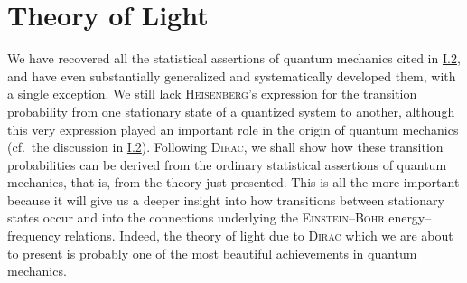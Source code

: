 \documentclass[fontsize=13pt,twoside,openany,headings=normal,parskip=false,bookmarkpackage=false,DIV=calc]{scrbook}
\begin{document}
\hypertarget{origpage-135}{}%
\section{Theory of Light}\label{sec:III.6}
We have recovered all the statistical assertions of quantum mechanics cited in \hyperref[sec:I.2]{I.2}, and have even substantially generalized and systematically developed them, with a single exception. We still lack \textsc{Heisenberg}'s expression for the transition probability from one stationary state of a quantized system to another, although this very expression played an important role in the origin of quantum mechanics (cf.\ the discussion in \hyperref[sec:I.2]{I.2}). Following \textsc{Dirac}, we shall show how these transition probabilities can be derived from the ordinary statistical assertions of quantum mechanics, that is, from the theory just presented. This is all the more important because it will give us a deeper insight into how transitions between stationary states occur and into the connections underlying the \textsc{Einstein--Bohr} energy--frequency relations. Indeed, the theory of light due to \textsc{Dirac} which we are about to present is probably one of the most beautiful achievements in quantum mechanics.
\end{document}
